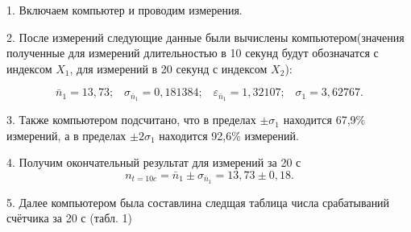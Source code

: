 \documentclass[a4paper,12pt]{article} %
\begin{document}
1. Включаем компьютер и проводим измерения.

2. После измерений следующие данные были вычислены компьютером(значения полученные для измерений длительностью в 10 секунд будут обозначатся с индексом $X_1$, для измерений в 20 секунд  с индексом $ X_2 $):

\[ \bar{n}_1 = 13,73; \;\;\; \sigma_{\bar{n}_1} = 0,181384; \;\;\; \varepsilon_{\bar{n}_1} = 1,32107; \;\;\; \sigma_1 = 3,62767.    \]


3. Также компьютером подсчитано, что в пределах $ \pm \sigma_1 $ находится 67,9\% измерений, а в пределах $ \pm 2\sigma_1 $ находится 92,6\% измерений.

4. Получим окончательный результат для измерений за 20 с
\[ n_{t=10c}=\bar{n}_1 \pm \sigma_{\bar{n}_1}=13,73\pm 0,18. \]

5. Далее компьютером была составлина следщая таблица числа срабатываний счётчика за 20 с (табл. 1)\\
\end{document}
